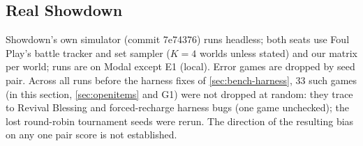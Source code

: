 \documentclass[10pt]{article}
\theoremstyle{plain}
\theoremstyle{definition}
\theoremstyle{remark}
\begin{document}
\subsection{Real Showdown}\label{sec:showdown}

Showdown's own simulator (commit 7e74376) runs headless; both seats use Foul Play's battle tracker and set sampler
($K=4$ worlds unless stated) and our matrix per world; runs are on Modal except E1 (local).
Error games are dropped by seed pair. Across all runs before the harness fixes of \cref{sec:bench-harness}, 33 such games
(in this section, \cref{sec:openitems} and G1) were not dropped at random: they trace to Revival Blessing and forced-recharge harness bugs (one game unchecked); the lost round-robin tournament seeds were rerun.
The direction of the resulting bias on any one pair score is not established.
\end{document}
